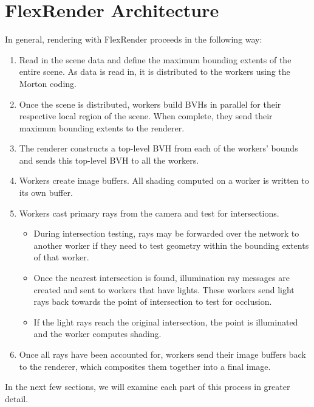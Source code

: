 \documentclass[a4paper,twoside]{article}
\begin{document}
\section{FlexRender Architecture}
\label{architecture}

In general, rendering with FlexRender proceeds in the following way:

\begin{enumerate}
    \item Read in the scene data and define the maximum bounding extents of the
        entire scene. As data is read in, it is distributed to the workers using
        the Morton coding.
    \item Once the scene is distributed, workers build BVHs in parallel for
        their respective local region of the scene. When complete, they send
        their maximum bounding extents to the renderer.
    \item The renderer constructs a top-level BVH from each of the workers'
        bounds and sends this top-level BVH to all the workers.
    \item Workers create image buffers. All shading computed on a worker is
        written to its own buffer. 
    \item Workers cast primary rays from the camera and test for intersections.
        \begin{itemize}
            \item During intersection testing, rays may be forwarded over the
                network to another worker if they need to test geometry within
                the bounding extents of that worker.
            \item Once the nearest intersection is found, illumination ray
                messages are created and sent to workers that have lights.
                These workers send light rays back towards the point of
                intersection to test for occlusion.
            \item If the light rays reach the original intersection, the point
                is illuminated and the worker computes shading.
        \end{itemize}
    \item Once all rays have been accounted for, workers send their image
        buffers back to the renderer, which composites them together into a
        final image.
\end{enumerate}

In the next few sections, we will examine each part of this process in greater
detail.
\end{document}
